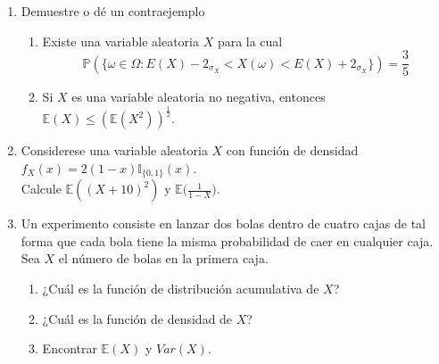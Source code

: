 \documentclass[12pt,a4paper]{report}
\begin{document}
\begin{enumerate}
		\item{
			Demuestre o dé un contraejemplo
			\begin{enumerate}
				\item {
					Existe una variable aleatoria $X$ para la cual
					\[\mathbb{P}(\{\omega \in \Omega : E(X) - 2_{\sigma_X} <
					X(\omega) <
					E(X) + 2_{\sigma_X}\}) = \frac{3}{5}\]
				}

				\item {
					Si $X$ es una variable aleatoria no negativa, entonces
					$\mathbb{E}(X) \leq (\mathbb{E}(X^2))^{\frac{1}{2}}$.
				}
			\end{enumerate}
		}

		\item{
			Considerese una variable aleatoria $X$ con función de densidad
			$f_X(x) = 2(1-x)\mathbb{I}_{\{0, 1\}}(x)$.\\
			Calcule $\mathbb{E}((X+10)^2)$ y
			$\mathbb{E}\Big(\frac{1}{1-X}\Big)$.
		}

		\item{
			Un experimento consiste en lanzar dos bolas dentro de cuatro cajas
			de tal forma que cada bola tiene la misma probabilidad de caer en
			cualquier caja. Sea $X$ el número de bolas en la primera caja.
			\begin{enumerate}
				\item {
					¿Cuál es la función de distribución acumulativa de $X$?
				}

				\item {
					¿Cuál es la función de densidad de $X$?
				}

				\item {
					Encontrar $\mathbb{E}(X)$ y $Var(X)$.
				}
			\end{enumerate}
		}


\end{enumerate}
\end{document}
